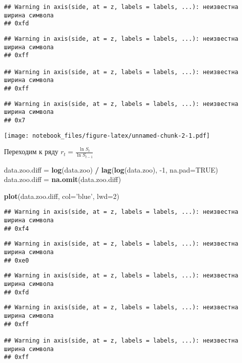 \documentclass[
]{article}
\newenvironment{Shaded}{\begin{snugshade}}{\end{snugshade}}
\newcommand{\DataTypeTok}[1]{\textcolor[rgb]{0.13,0.29,0.53}{#1}}
\newcommand{\DecValTok}[1]{\textcolor[rgb]{0.00,0.00,0.81}{#1}}
\newcommand{\KeywordTok}[1]{\textcolor[rgb]{0.13,0.29,0.53}{\textbf{#1}}}
\newcommand{\NormalTok}[1]{#1}
\newcommand{\OperatorTok}[1]{\textcolor[rgb]{0.81,0.36,0.00}{\textbf{#1}}}
\newcommand{\OtherTok}[1]{\textcolor[rgb]{0.56,0.35,0.01}{#1}}
\newcommand{\StringTok}[1]{\textcolor[rgb]{0.31,0.60,0.02}{#1}}
\begin{document}
\begin{verbatim}
## Warning in axis(side, at = z, labels = labels, ...): неизвестна ширина символа
## 0xfd
\end{verbatim}

\begin{verbatim}
## Warning in axis(side, at = z, labels = labels, ...): неизвестна ширина символа
## 0xff

## Warning in axis(side, at = z, labels = labels, ...): неизвестна ширина символа
## 0xff
\end{verbatim}

\begin{verbatim}
## Warning in axis(side, at = z, labels = labels, ...): неизвестна ширина символа
## 0x7
\end{verbatim}

\texttt{[image: notebook\_files/figure-latex/unnamed-chunk-2-1.pdf]}

Переходим к ряду \(r_t = \frac{\ln{S_t}}{\ln{S_{t-1}}}\)

\begin{Shaded}
\begin{Highlighting}[]
\NormalTok{data.zoo.diff =}\StringTok{ }\KeywordTok{log}\NormalTok{(data.zoo) }\OperatorTok{/}\StringTok{ }\KeywordTok{lag}\NormalTok{(}\KeywordTok{log}\NormalTok{(data.zoo), }\DecValTok{-1}\NormalTok{, }\DataTypeTok{na.pad=}\OtherTok{TRUE}\NormalTok{)}
\NormalTok{data.zoo.diff =}\StringTok{ }\KeywordTok{na.omit}\NormalTok{(data.zoo.diff)}

\KeywordTok{plot}\NormalTok{(data.zoo.diff, }\DataTypeTok{col=}\StringTok{'blue'}\NormalTok{, }\DataTypeTok{lwd=}\DecValTok{2}\NormalTok{)}
\end{Highlighting}
\end{Shaded}

\begin{verbatim}
## Warning in axis(side, at = z, labels = labels, ...): неизвестна ширина символа
## 0xf4
\end{verbatim}

\begin{verbatim}
## Warning in axis(side, at = z, labels = labels, ...): неизвестна ширина символа
## 0xe0
\end{verbatim}

\begin{verbatim}
## Warning in axis(side, at = z, labels = labels, ...): неизвестна ширина символа
## 0xfd
\end{verbatim}

\begin{verbatim}
## Warning in axis(side, at = z, labels = labels, ...): неизвестна ширина символа
## 0xff

## Warning in axis(side, at = z, labels = labels, ...): неизвестна ширина символа
## 0xff
\end{verbatim}
\end{document}

